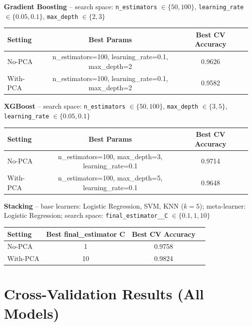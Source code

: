 \documentclass[12pt,a4paper]{article}
\begin{document}
\textbf{Gradient Boosting} -- search space: \texttt{n\_estimators} $\in\{50,100\}$, \texttt{learning\_rate} $\in\{0.05,0.1\}$, \texttt{max\_depth} $\in\{2,3\}$
\begin{longtable}{lccc}
\toprule
Setting & Best Params & Best CV Accuracy\\
\midrule
No-PCA & n\_estimators=100, learning\_rate=0.1, max\_depth=2 & 0.9626\\
With-PCA & n\_estimators=100, learning\_rate=0.1, max\_depth=2 & 0.9582\\
\bottomrule
\end{longtable}

\textbf{XGBoost} -- search space: \texttt{n\_estimators} $\in\{50,100\}$, \texttt{max\_depth} $\in\{3,5\}$, \texttt{learning\_rate} $\in\{0.05,0.1\}$
\begin{longtable}{lccc}
\toprule
Setting & Best Params & Best CV Accuracy\\
\midrule
No-PCA & n\_estimators=100, max\_depth=3, learning\_rate=0.1 & 0.9714\\
With-PCA & n\_estimators=100, max\_depth=5, learning\_rate=0.1 & 0.9648\\
\bottomrule
\end{longtable}

\textbf{Stacking} -- base learners: Logistic Regression, SVM, KNN ($k=5$); meta-learner: Logistic Regression; search space: \texttt{final\_estimator\_\_C} $\in\{0.1,1,10\}$
\begin{longtable}{lccc}
\toprule
Setting & Best final\_estimator C & Best CV Accuracy\\
\midrule
No-PCA & 1 & 0.9758\\
With-PCA & 10 & 0.9824\\
\bottomrule
\end{longtable}

\section{Cross-Validation Results (All Models)}
\end{document}

